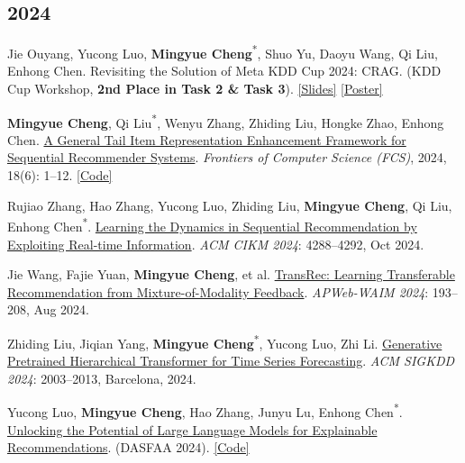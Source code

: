 \documentclass[UTF8,fontset=fandol,scheme=plain,11pt,a4paper]{ctexart}
\newcommand{\pubentry}[1]{\item \begin{minipage}[t]{\linewidth}#1\end{minipage}}
\begin{document}
\subsection{2024}
\begin{publist}[start=43]
\pubentry{Jie Ouyang, Yucong Luo, \textbf{Mingyue Cheng}\textsuperscript{*}, Shuo Yu, Daoyu Wang, Qi Liu, Enhong Chen. Revisiting the Solution of Meta KDD Cup 2024: CRAG. (KDD Cup Workshop, \textbf{2nd Place in Task 2 \& Task 3}). \href{https://mingyue-cheng.github.io/files/posters/KDD-slide-v4.pdf}{[Slides]} \href{https://mingyue-cheng.github.io/files/posters/crag\_kddcup.pdf}{[Poster]}}

\pubentry{\textbf{Mingyue Cheng}, Qi Liu\textsuperscript{*}, Wenyu Zhang, Zhiding Liu, Hongke Zhao, Enhong Chen. \href{https://mingyue-cheng.github.io/files/papers/tailrec-fcs2024.pdf}{A General Tail Item Representation Enhancement Framework for Sequential Recommender Systems}. \emph{Frontiers of Computer Science (FCS)}, 2024, 18(6): 1--12. \href{https://github.com/Mingyue-Cheng/TailRec}{[Code]}}

\pubentry{Rujiao Zhang, Hao Zhang, Yucong Luo, Zhiding Liu, \textbf{Mingyue Cheng}, Qi Liu, Enhong Chen\textsuperscript{*}. \href{https://dl.acm.org/doi/pdf/10.1145/3627673.3679955}{Learning the Dynamics in Sequential Recommendation by Exploiting Real-time Information}. \emph{ACM CIKM 2024}: 4288--4292, Oct 2024.}

\pubentry{Jie Wang, Fajie Yuan, \textbf{Mingyue Cheng}, et al. \href{https://arxiv.org/pdf/2206.06190.pdf}{TransRec: Learning Transferable Recommendation from Mixture-of-Modality Feedback}. \emph{APWeb-WAIM 2024}: 193--208, Aug 2024.}

\pubentry{Zhiding Liu, Jiqian Yang, \textbf{Mingyue Cheng}\textsuperscript{*}, Yucong Luo, Zhi Li. \href{https://arxiv.org/pdf/2402.16516.pdf}{Generative Pretrained Hierarchical Transformer for Time Series Forecasting}. \emph{ACM SIGKDD 2024}: 2003--2013, Barcelona, 2024.}

\pubentry{Yucong Luo, \textbf{Mingyue Cheng}, Hao Zhang, Junyu Lu, Enhong Chen\textsuperscript{*}. \href{https://arxiv.org/pdf/2312.15661}{Unlocking the Potential of Large Language Models for Explainable Recommendations}. (DASFAA 2024). \href{https://github.com/GodFire66666/LLM\_rec\_explanation}{[Code]}}


\end{publist}
\end{document}
